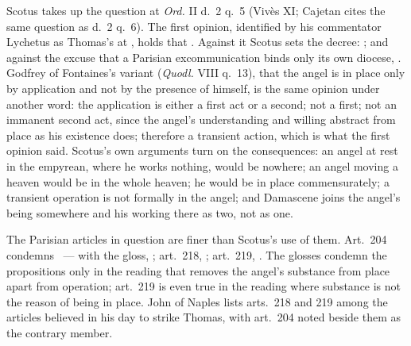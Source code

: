 Scotus takes up the question at \emph{Ord.} II d.~2 q.~5 (Vivès XI;
Cajetan cites the same question as d.~2 q.~6). The first opinion,
identified by his commentator Lychetus as Thomas's at , holds that . Against it Scotus
sets the decree: ; and against
the excuse that a Parisian excommunication binds only its own diocese,
. Godfrey of Fontaines's variant (\emph{Quodl.} VIII
q.~13), that the angel is in place only by application and not by the
presence of himself, is the same opinion under another word: the
application is either a first act or a second; not a first; not an
immanent second act, since the angel's understanding and willing abstract
from place as his existence does; therefore a transient action, which is
what the first opinion said. Scotus's own arguments turn on the
consequences: an angel at rest in the empyrean, where he works nothing,
would be nowhere; an angel moving a heaven would be in the whole heaven;
he would be in place commensurately; a transient operation is not
formally in the angel; and Damascene joins the angel's being somewhere
and his working there as two, not as one.

The Parisian articles in question are finer than Scotus's use of them.
Art.~204 condemns ~--- with the gloss, ;
art.~218, ; art.~219, . The glosses condemn the propositions only in the
reading that removes the angel's substance from place apart from
operation; art.~219 is even true in the reading where substance is not
the reason of being in place. John of Naples lists arts.~218 and 219
among the articles believed in his day to strike Thomas, with art.~204
noted beside them as the contrary member.

